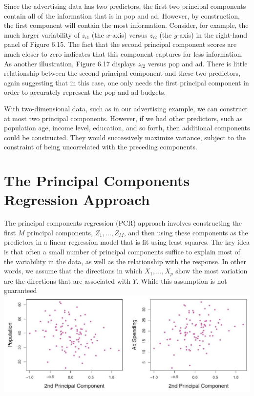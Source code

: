 \documentclass[10pt]{article}
\begin{document}
Since the advertising data has two predictors, the first two principal components contain all of the information that is in pop and ad. However, by construction, the first component will contain the most information. Consider, for example, the much larger variability of $z_{i 1}$ (the $x$-axis) versus $z_{i 2}$ (the $y$-axis) in the right-hand panel of Figure 6.15. The fact that the second principal component scores are much closer to zero indicates that this component captures far less information. As another illustration, Figure 6.17 displays $z_{i 2}$ versus pop and ad. There is little relationship between the second principal component and these two predictors, again suggesting that in this case, one only needs the first principal component in order to accurately represent the pop and ad budgets.

With two-dimensional data, such as in our advertising example, we can construct at most two principal components. However, if we had other predictors, such as population age, income level, education, and so forth, then additional components could be constructed. They would successively maximize variance, subject to the constraint of being uncorrelated with the preceding components.

\section*{The Principal Components Regression Approach}
The principal components regression (PCR) approach involves constructing the first $M$ principal components, $Z_{1}, \ldots, Z_{M}$, and then using these components as the predictors in a linear regression model that is fit using least squares. The key idea is that often a small number of principal components suffice to explain most of the variability in the data, as well as the relationship with the response. In other words, we assume that the directions in which $X_{1}, \ldots, X_{p}$ show the most variation are the directions that are associated with $Y$. While this assumption is not guaranteed\\
\includegraphics[max width=\textwidth, center]{2025_05_05_efe77898333945044de4g-249(1)}
\end{document}
